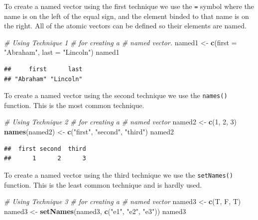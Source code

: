 \documentclass[
]{book}
\newenvironment{Shaded}{\begin{snugshade}}{\end{snugshade}}
\newcommand{\CommentTok}[1]{\textcolor[rgb]{0.56,0.35,0.01}{\textit{#1}}}
\newcommand{\DataTypeTok}[1]{\textcolor[rgb]{0.13,0.29,0.53}{#1}}
\newcommand{\DecValTok}[1]{\textcolor[rgb]{0.00,0.00,0.81}{#1}}
\newcommand{\KeywordTok}[1]{\textcolor[rgb]{0.13,0.29,0.53}{\textbf{#1}}}
\newcommand{\NormalTok}[1]{#1}
\newcommand{\StringTok}[1]{\textcolor[rgb]{0.31,0.60,0.02}{#1}}
\begin{document}
To create a named vector using the first technique we use the \texttt{=} symbol where the name is on the left of the equal sign, and the element binded to that name is on the right. All of the atomic vectors can be defined so their elements are named.

\begin{Shaded}
\begin{Highlighting}[]
\CommentTok{# Using Technique 1}
\CommentTok{# for creating a}
\CommentTok{# named vector.}
\NormalTok{named1 <-}\StringTok{ }\KeywordTok{c}\NormalTok{(}\DataTypeTok{first =} \StringTok{"Abraham"}\NormalTok{,}
    \DataTypeTok{last =} \StringTok{"Lincoln"}\NormalTok{)}
\NormalTok{named1}
\end{Highlighting}
\end{Shaded}

\begin{verbatim}
##     first      last 
## "Abraham" "Lincoln"
\end{verbatim}

To create a named vector using the second technique we use the \texttt{names()} function. This is the most common technique.

\begin{Shaded}
\begin{Highlighting}[]
\CommentTok{# Using Technique 2}
\CommentTok{# for creating a}
\CommentTok{# named vector}
\NormalTok{named2 <-}\StringTok{ }\KeywordTok{c}\NormalTok{(}\DecValTok{1}\NormalTok{, }\DecValTok{2}\NormalTok{, }\DecValTok{3}\NormalTok{)}
\KeywordTok{names}\NormalTok{(named2) <-}\StringTok{ }\KeywordTok{c}\NormalTok{(}\StringTok{"first"}\NormalTok{,}
    \StringTok{"second"}\NormalTok{, }\StringTok{"third"}\NormalTok{)}
\NormalTok{named2}
\end{Highlighting}
\end{Shaded}

\begin{verbatim}
##  first second  third 
##      1      2      3
\end{verbatim}

To create a named vector using the third technique we use the \texttt{setNames()} function. This is the least common technique and is hardly used.

\begin{Shaded}
\begin{Highlighting}[]
\CommentTok{# Using Technique 3}
\CommentTok{# for creating a}
\CommentTok{# named vector}
\NormalTok{named3 <-}\StringTok{ }\KeywordTok{c}\NormalTok{(T, F, T)}
\NormalTok{named3 <-}\StringTok{ }\KeywordTok{setNames}\NormalTok{(named3,}
    \KeywordTok{c}\NormalTok{(}\StringTok{"e1"}\NormalTok{, }\StringTok{"e2"}\NormalTok{, }\StringTok{"e3"}\NormalTok{))}
\NormalTok{named3}
\end{Highlighting}
\end{Shaded}
\end{document}
